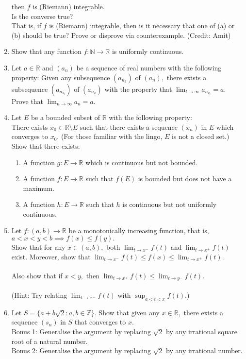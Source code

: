\documentclass{article}
\begin{document}
\begin{enumerate}
	then $f$ is (Riemann) integrable.\\
	Is the converse true?\\
	That is, if $f$ is (Riemann) integrable, then is it necessary that one of (a) or (b) should be true? Prove or disprove via counterexample. \hfill (Credit: Amit)
	\item Show that any function $f:\mathbb{N} \to \mathbb{R}$ is uniformly continuous.
	\item Let $a \in \mathbb{R}$ and $(a_n)$ be a sequence of real numbers with the following property: Given any subsequence $\left(a_{n_k}\right)$ of $(a_n),$ there exists a subsequence $\left(a_{n_{k_l}}\right)$ of $\left(a_{n_k}\right)$ with the property that $\displaystyle\lim_{l\to \infty}a_{n_{k_l}}	= a.$\\
	Prove that $\displaystyle\lim_{n\to \infty}a_n = a.$
	\item Let $E$ be a bounded subset of $\mathbb{R}$ with the following property:\\
	There exists $x_0 \in \mathbb{R}\setminus E$ such that there exists a sequence $(x_n)$ in $E$ which converges to $x_0.$ (For those familiar with the lingo, $E$ is not a closed set.)\\
	Show that there exists:
	\begin{enumerate}[nosep] 
		\item A function $g:E\to \mathbb{R}$ which is continuous but not bounded.
		\item A function $f:E\to \mathbb{R}$ such that $f(E)$ is bounded but does not have a maximum.
		\item A function $h:E\to \mathbb{R}$ such that $h$ is continuous but not uniformly continuous.
	\end{enumerate}
	\item Let $f:(a, b) \to \mathbb{R}$ be a monotonically increasing function, that is, $a < x < y < b \implies f(x) \le f(y).$\\
	Show that for any $x \in (a, b),$ both $\displaystyle\lim_{t\to x^-}f(t)$ and $\displaystyle\lim_{t\to x^+}f(t)$ exist. Moreover, show that $\displaystyle\lim_{t\to x^-}f(t) \le f(x) \le \displaystyle\lim_{t\to x^+}f(t).$\\~\\
	Also show that if $x < y,$ then $\displaystyle\lim_{t\to x^+}f(t) \le \displaystyle \lim_{t\to y^-}f(t).$\\~\\
	(Hint: Try relating $\displaystyle\lim_{t\to x^-}f(t)$ with $\displaystyle\sup_{a < t < x}f(t).$)
	\item Let $S = \{a + b\sqrt{2} : a, b \in \mathbb{Z}\}.$ Show that given any $x \in \mathbb{R},$ there exists a sequence $(s_n)$ in $S$ that converges to $x.$\\
	Bonus 1: Generalise the argument by replacing $\sqrt{2}$ by any irrational square root of a natural number.\\
	Bonus 2: Generalise the argument by replacing $\sqrt{2}$ by any irrational number.
\end{enumerate}
\end{document}
